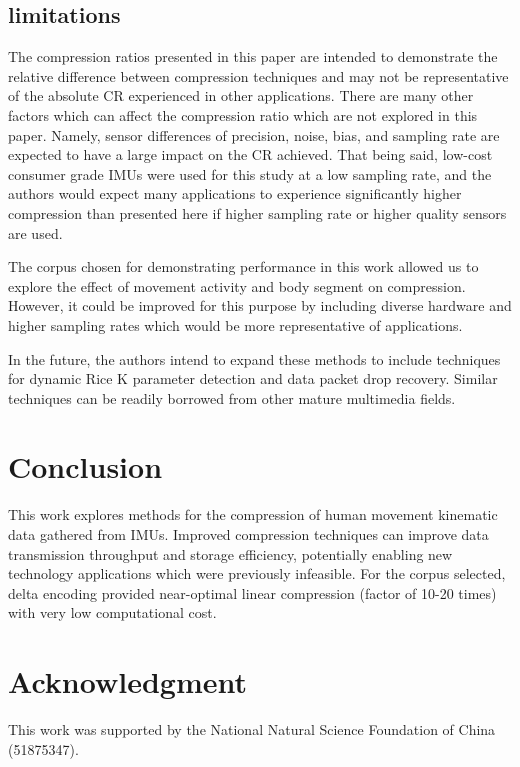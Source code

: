 \documentclass[journal]{IEEEtran}
\begin{document}
\subsection{limitations}

The compression ratios presented in this paper are intended to demonstrate the relative difference between compression techniques and may not be representative of the absolute CR experienced in other applications. There are many other factors which can affect the compression ratio which are not explored in this paper. Namely, sensor differences of precision, noise, bias, and sampling rate are expected to have a large impact on the CR achieved. That being said, low-cost consumer grade IMUs were used for this study at a low sampling rate, and the authors would expect many applications to experience significantly higher compression than presented here if higher sampling rate or higher quality sensors are used.

The corpus chosen for demonstrating performance in this work allowed us to explore the effect of movement activity and body segment on compression. However, it could be improved for this purpose by including diverse hardware and higher sampling rates which would be more representative of applications.

In the future, the authors intend to expand these methods to include techniques for dynamic Rice K parameter detection and data packet drop recovery. Similar techniques can be readily borrowed from other mature multimedia fields.

\section{Conclusion}
This work explores methods for the compression of human movement kinematic data gathered from IMUs. Improved compression techniques can improve data transmission throughput and storage efficiency, potentially enabling new technology applications which were previously infeasible. For the corpus selected, delta encoding provided near-optimal linear compression (factor of 10-20 times) with very low computational cost.

\section*{Acknowledgment}
This work was supported by the National Natural Science
Foundation of China (51875347).

{}

\end{document}
